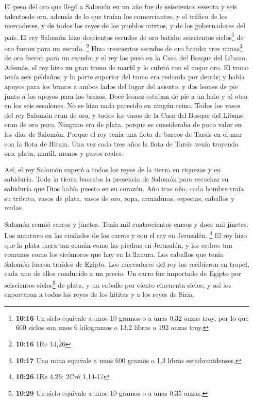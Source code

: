  El peso del oro que llegó a Salomón en un año fue de
seiscientos sesenta y seis talentosde oro,  además de lo
que traían los comerciantes, y el tráfico de los mercaderes, y de todos
los reyes de los pueblos mixtos, y de los gobernadores del país.
 El rey Salomón hizo doscientos escudos de oro batido;
seiscientos siclos\footnote{\textbf{10:16} Un siclo equivale a unos 10
  gramos o a unas 0,32 onzas troy, por lo que 600 siclos son unos 6
  kilogramos o 13,2 libras o 192 onzas troy.} de oro fueron para un
escudo. \footnote{\textbf{10:16} 1Re 14,26}  Hizo
trescientos escudos de oro batido; tres minas\footnote{\textbf{10:17}
  Una mina equivale a unos 600 gramos o 1,3 libras estadounidenses.} de
oro fueron para un escudo; y el rey los puso en la Casa del Bosque del
Líbano.  Además, el rey hizo un gran trono de marfil y lo
cubrió con el mejor oro.  El trono tenía seis peldaños, y
la parte superior del trono era redonda por detrás; y había apoyos para
los brazos a ambos lados del lugar del asiento, y dos leones de pie
junto a los apoyos para los brazos.  Doce leones estaban
de pie a un lado y al otro en los seis escalones. No se hizo nada
parecido en ningún reino.  Todos los vasos del rey
Salomón eran de oro, y todos los vasos de la Casa del Bosque del Líbano
eran de oro puro. Ninguno era de plata, porque se consideraba de poco
valor en los días de Salomón.  Porque el rey tenía una
flota de barcos de Tarsis en el mar con la flota de Hiram. Una vez cada
tres años la flota de Tarsis venía trayendo oro, plata, marfil, monos y
pavos reales.

 Así, el rey Salomón superó a todos los reyes de la
tierra en riquezas y en sabiduría.  Toda la tierra
buscaba la presencia de Salomón para escuchar su sabiduría que Dios
había puesto en su corazón.  Año tras año, cada hombre
traía su tributo, vasos de plata, vasos de oro, ropa, armaduras,
especias, caballos y mulas.

 Salomón reunió carros y jinetes. Tenía mil cuatrocientos
carros y doce mil jinetes. Los mantuvo en las ciudades de los carros y
con el rey en Jerusalén. \footnote{\textbf{10:26} 1Re 4,26; 2Cró 1,14-17}
 El rey hizo que la plata fuera tan común como las
piedras en Jerusalén, y los cedros tan comunes como los sicómoros que
hay en la llanura.  Los caballos que tenía Salomón fueron
traídos de Egipto. Los mercaderes del rey los recibieron en tropel, cada
uno de ellos conducido a un precio.  Un carro fue
importado de Egipto por seiscientos siclos\footnote{\textbf{10:29} Un
  siclo equivale a unos 10 gramos o a unas 0,35 onzas.} de plata, y un
caballo por ciento cincuenta siclos; y así los exportaron a todos los
reyes de los hititas y a los reyes de Siria.

